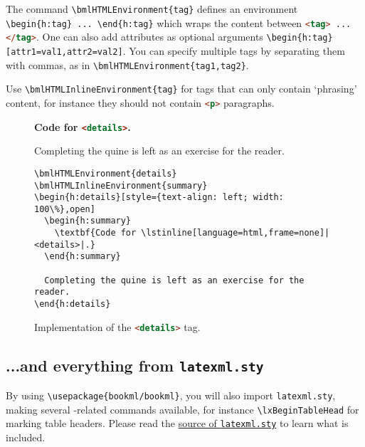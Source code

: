 \documentclass[a4paper,british]{article}
\def\ltxinline{\lstinline[style=bookml]}
\def\htmlinline{\lstinline[language=html]}
\begin{document}
The command \ltxinline|\bmlHTMLEnvironment{tag}| defines an environment \ltxinline|\begin{h:tag} ... \end{h:tag}| which wraps the content between \lstinline[language=html,frame=none]|<tag> ... </tag>|. One can also add attributes as optional arguments \ltxinline|\begin{h:tag}[attr1=val1,attr2=val2]|. You can specify multiple tags by separating them with commas, as in \ltxinline|\bmlHTMLEnvironment{tag1,tag2}|.

Use \ltxinline|\bmlHTMLInlineEnvironment{tag}| for tags that can only contain `phrasing' content, for instance they should not contain \htmlinline|<p>| paragraphs.

\begin{figure}
  \begin{h:details}[style={text-align: left; width: 100\%},open]
    \begin{h:summary}
      \textbf{Code for \lstinline[language=html,frame=none]|<details>|.}
    \end{h:summary}

    Completing the quine is left as an exercise for the reader.
    \begin{lstlisting}[style=bookml]
\bmlHTMLEnvironment{details}
\bmlHTMLInlineEnvironment{summary}
\begin{h:details}[style={text-align: left; width: 100\%},open]
  \begin{h:summary}
    \textbf{Code for \lstinline[language=html,frame=none]|<details>|.}
  \end{h:summary}

  Completing the quine is left as an exercise for the reader.
\end{h:details}
    \end{lstlisting}
  \end{h:details}
  \caption{Implementation of the \htmlinline|<details>| tag.}
  \label{fig:details}
\end{figure}

\subsection{...and everything from \texttt{latexml.sty}}
By using \ltxinline|\usepackage{bookml/bookml}|, you will also import \texttt{latexml.sty}, making several \LaTeXML{}-related commands available, for instance \ltxinline|\lxBeginTableHead| for marking table headers. Please read the \href{https://github.com/brucemiller/LaTeXML/blob/81f2f004bdaa6860d673382837c4d4e3951a602e/lib/LaTeXML/texmf/latexml.sty}{source of \texttt{latexml.sty}} to learn what is included.
\end{document}
